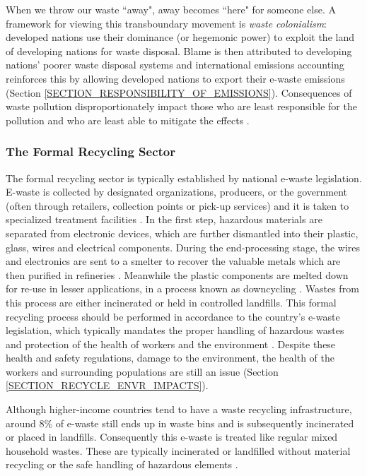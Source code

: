 \documentclass{article}
\begin{document}
When we throw our waste ``away", away becomes ``here" for someone else. A framework for viewing this transboundary movement is \textit{waste colonialism}: developed nations use their dominance (or hegemonic power) to exploit the land of developing nations for waste disposal. Blame is then attributed to developing nations' poorer waste disposal systems and international emissions accounting reinforces this by allowing developed nations to export their e-waste emissions (Section \ref{SECTION_RESPONSIBILITY_OF_EMISSIONS}). Consequences of waste pollution disproportionately impact those who are least responsible for the pollution and who are least able to mitigate the effects \cite{liboiron2018plastic, pratt2010decreasing}.


\cleardoublepage
\subsubsection{The Formal Recycling Sector}

The formal recycling sector is typically established by national e-waste legislation. E-waste is collected by designated organizations, producers, or the government (often through retailers, collection points or pick-up services) and it is taken to specialized treatment facilities \cite{forti2020global}. In the first step, hazardous materials are separated from electronic devices, which are further dismantled into their plastic, glass, wires and electrical components. During the end-processing stage, the wires and electronics are sent to a smelter to recover the valuable metals which are then purified in refineries \cite{kumar2017waste}. Meanwhile the plastic components are melted down for re-use in lesser applications, in a process known as downcycling \cite{braungart2007cradle}. Wastes from this process are either incinerated or held in controlled landfills. This formal recycling process should be performed in accordance to the country's e-waste legislation, which typically mandates the proper handling of hazardous wastes and protection of the health of workers and the environment \cite{forti2020global}. Despite these health and safety regulations, damage to the environment, the health of the workers and surrounding populations are still an issue (Section \ref{SECTION_RECYCLE_ENVR_IMPACTS}).

Although higher-income countries tend to have a waste recycling infrastructure, around 8\% of e-waste still ends up in waste bins and is subsequently incinerated or placed in landfills. Consequently this e-waste is treated like regular mixed household wastes. These are typically incinerated or landfilled without material recycling or the safe handling of hazardous elements \cite{forti2020global}. 
\end{document}
